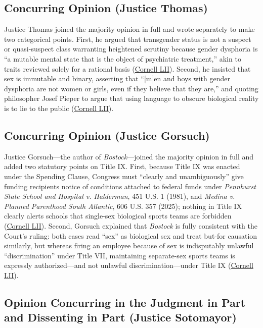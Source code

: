 \documentclass[12pt]{article}
\begin{document}
\subsection{Concurring Opinion (Justice Thomas)}

Justice Thomas joined the majority opinion in full and wrote separately to make two categorical points. First, he argued that transgender status is not a suspect or quasi-suspect class warranting heightened scrutiny because gender dysphoria is ``a mutable mental state that is the object of psychiatric treatment,'' akin to traits reviewed solely for a rational basis (\href{https://www.law.cornell.edu/supremecourt/text/24-43}{Cornell LII}). Second, he insisted that sex is immutable and binary, asserting that ``[m]en and boys with gender dysphoria are not women or girls, even if they believe that they are,'' and quoting philosopher Josef Pieper to argue that using language to obscure biological reality is to lie to the public (\href{https://www.law.cornell.edu/supremecourt/text/24-43}{Cornell LII}).

\subsection{Concurring Opinion (Justice Gorsuch)}

Justice Gorsuch---the author of \textit{Bostock}---joined the majority opinion in full and added two statutory points on Title IX. First, because Title IX was enacted under the Spending Clause, Congress must ``clearly and unambiguously'' give funding recipients notice of conditions attached to federal funds under \textit{Pennhurst State School and Hospital v. Halderman}, 451 U.S. 1 (1981), and \textit{Medina v. Planned Parenthood South Atlantic}, 606 U.S. 357 (2025); nothing in Title IX clearly alerts schools that single-sex biological sports teams are forbidden (\href{https://www.law.cornell.edu/supremecourt/text/24-43}{Cornell LII}). Second, Gorsuch explained that \textit{Bostock} is fully consistent with the Court's ruling: both cases read ``sex'' as biological sex and treat but-for causation similarly, but whereas firing an employee because of sex is indisputably unlawful ``discrimination'' under Title VII, maintaining separate-sex sports teams is expressly authorized---and not unlawful discrimination---under Title IX (\href{https://www.law.cornell.edu/supremecourt/text/24-43}{Cornell LII}).

\subsection{Opinion Concurring in the Judgment in Part and Dissenting in Part (Justice Sotomayor)}
\end{document}
